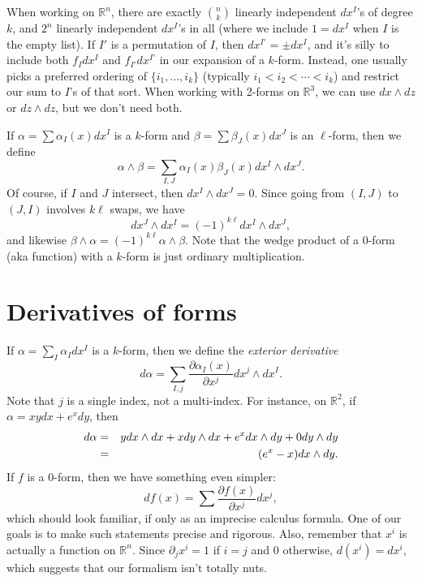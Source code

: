 \documentclass[12pt]{amsbook}
\newcommand{\R}{{\mathbb R}}
\theoremstyle{definition}
\begin{document}
When working on $\R^n$, there are exactly $n \choose k$ linearly independent 
$dx^I$'s of degree $k$, and $2^n$ linearly independent $dx^I$'s in all 
(where we include $1=dx^I$ when $I$ is the empty list). If $I'$ is a permutation
of $I$, then $dx^{I'} = \pm dx^I$, and it's silly to include both 
$f_I dx^I$ and $f_{I'} dx^{I'}$ in our expansion of a $k$-form. Instead, one
usually picks a preferred ordering of $\{i_1,\ldots, i_k\}$ (typically 
$i_1 < i_2 < \cdots < i_k$) and restrict our sum to $I$'s of that sort. When
working with 2-forms on $\R^3$, we can use $dx \wedge dz$ or $dz \wedge dz$,
but we don't need both. 


If $\alpha = \sum \alpha_I(x) dx^I$ is a $k$-form 
and $\beta = \sum \beta_J(x) dx^J$ is an $\ell$-form, then we define
$$ \alpha \wedge \beta = \sum_{I,J} \alpha_I(x)\beta_J(x) dx^I \wedge dx^J.$$
Of course, if $I$ and $J$ intersect, then $dx^I \wedge dx^J=0$. Since 
going from $(I,J)$ to $(J,I)$ involves $k\ell$ swaps, we have 
$$dx^J \wedge dx^I = (-1)^{k\ell} dx^I \wedge dx^J, $$
and likewise $\beta \wedge \alpha = (-1)^{k\ell} \alpha \wedge \beta$. 
Note that the wedge product of a 0-form (aka function) with a $k$-form is 
just ordinary multiplication. 

\section{Derivatives of forms}

If $\alpha = \sum_I \alpha_I dx^I$ is a $k$-form, then we define
the {\em exterior derivative}
$$ d\alpha = \sum_{I,j} \frac{\partial \alpha_I(x)}{\partial x^j}
dx^j \wedge dx^I.$$
Note that $j$ is a single index, not a multi-index. For instance, on $\R^2$, 
if $\alpha = xy dx + e^x dy$, then 
\begin{eqnarray} d \alpha & = & y dx \wedge dx + x dy \wedge dx 
+ e^x dx \wedge dy + 0 dy \wedge dy \cr 
& = & (e^x-x) dx \wedge dy.
\end{eqnarray}
If $f$ is a 0-form, then we have something even simpler:
$$ df(x) = \sum \frac{\partial f(x)}{\partial x^j} dx^j,$$
which should look familiar, if only as an imprecise calculus formula. 
One of our goals is to make such statements precise and rigorous. 
Also, remember that $x^i$ is actually a function on $\R^n$. Since 
$\partial_j x^i = 1$ if $i=j$ and 0 otherwise, $d(x^i) = dx^i$, which suggests that
our formalism isn't totally nuts. 
\end{document}
